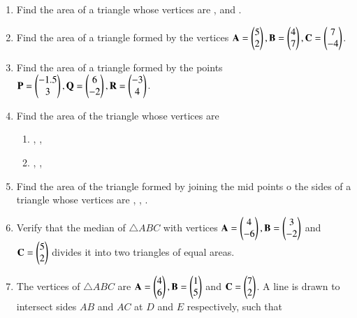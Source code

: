 \renewcommand{\theequation}{\theenumi}
\begin{enumerate}[label=\arabic*.,ref=\thesubsection.\theenumi]

\item Find the area of a triangle whose vertices are ,  and .
\item Find the area of a triangle formed by the vertices $\mathbf{A}=\begin{pmatrix}5\\2\end{pmatrix}, \mathbf{B}=\begin{pmatrix}4\\7\end{pmatrix}, \mathbf{C}=\begin{pmatrix}7\\-4\end{pmatrix}$.
\item Find the area of a triangle formed by the points $\mathbf{P}=\begin{pmatrix}-1.5\\3\end{pmatrix}, \mathbf{Q}=\begin{pmatrix}6\\-2\end{pmatrix}, \mathbf{R}=\begin{pmatrix}-3\\4\end{pmatrix}$.
\item Find the area of the triangle whose vertices are
\begin{enumerate}
\item {}, ,  
\item  {},  ,  
\end{enumerate}
\item Find the area of the triangle formed by joining the mid points o the sides of a triangle whose vertices are  ,  ,  .
\item Verify that the median of $\triangle ABC$ with vertices $\mathbf{A}=\begin{pmatrix}4\\-6\end{pmatrix},  \mathbf{B}=\begin{pmatrix}3\\-2\end{pmatrix}$ and  $\mathbf{C} =  \begin{pmatrix}5\\2\end{pmatrix}$ divides it into two triangles of equal areas.
\item The vertices of $\triangle ABC$ are $\mathbf{A}=\begin{pmatrix}4\\6\end{pmatrix},  \mathbf{B}=\begin{pmatrix}1\\5\end{pmatrix}$ and  $\mathbf{C} =  \begin{pmatrix}7\\2\end{pmatrix}$.  A line is drawn to intersect sides $AB$ and $AC$ at $D$ and $E$ respectively, such that

\end{enumerate}

